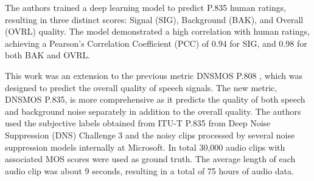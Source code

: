 The authors trained a deep learning model to predict P.835 human ratings, resulting in three distinct scores: Signal (SIG), Background (BAK), and Overall (OVRL) quality. The model demonstrated a high correlation with human ratings, achieving a Pearson's Correlation Coefficient (PCC) of 0.94 for SIG, and 0.98 for both BAK and OVRL.

This work was an extension to the previous metric DNSMOS P.808 \cite{reddy2021dnsmosnonintrusiveperceptualobjective}, which was designed to predict the overall quality of speech signals. The new metric, DNSMOS P.835, is more comprehensive as it predicts the quality of both speech and background noise separately in addition to the overall quality. The authors used the subjective labels obtained from ITU-T P.835 from Deep Noise Suppression (DNS) Challenge 3 \cite{reddy2021interspeech2021deepnoise} and the noisy clips processed by several noise suppression models internally at Microsoft. In total 30,000 audio clips with associated MOS scores were used as ground truth.  The average length of each audio clip was about 9 seconds, resulting in a total of 75 hours of audio data.

